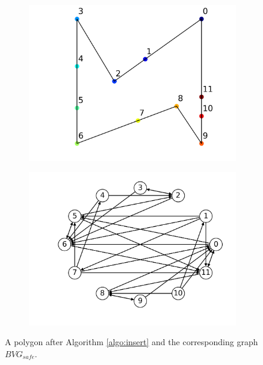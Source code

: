 \documentclass[]{styles/svproc}  %
\begin{document}
\begin{figure}
\centering
\begin{subfigure}{0.5\textwidth}
\centering
\includegraphics[width=\linewidth]{figures/simple_bit_inserted.png}
\end{subfigure}%
\begin{subfigure}{0.5\textwidth}
\centering
\includegraphics[width=\linewidth]{figures/simple_bit_safe_graph.png}
\end{subfigure}
\caption{A polygon after Algorithm \ref{algo:insert} and the corresponding graph
$BVG_{safe}$. }
\label{fig:simple_bit}
\end{figure}
\end{document}
